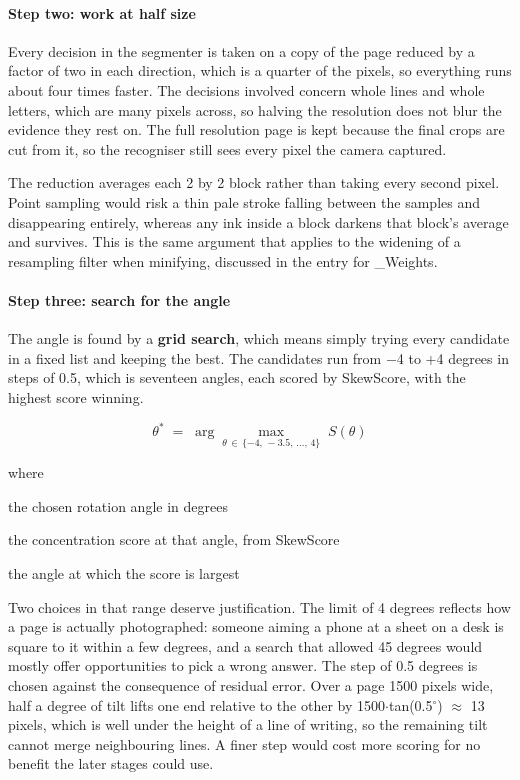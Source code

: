 \paragraph{Step two: work at half size}
Every decision in the segmenter is taken on a copy of the page reduced by a factor of two in each direction, which is a quarter of the pixels, so everything runs about four times faster. The decisions involved concern whole lines and whole letters, which are many pixels across, so halving the resolution does not blur the evidence they rest on. The full resolution page is kept because the final crops are cut from it, so the recogniser still sees every pixel the camera captured.

The reduction averages each 2 by 2 block rather than taking every second pixel. Point sampling would risk a thin pale stroke falling between the samples and disappearing entirely, whereas any ink inside a block darkens that block's average and survives. This is the same argument that applies to the widening of a resampling filter when minifying, discussed in the entry for \_Weights.


\paragraph{Step three: search for the angle}
The angle is found by a \textbf{grid search}, which means simply trying every candidate in a fixed list and keeping the best. The candidates run from $-$4 to +4 degrees in steps of 0.5, which is seventeen angles, each scored by SkewScore, with the highest score winning.


\begin{equation}
\theta^{*} \;=\; \arg\max_{\theta \,\in\, \{-4,\,-3.5,\,\dots,\,4\}} \; S(\theta)
\end{equation}

\noindent where
\begin{description}[leftmargin=2.4em,style=nextline,font=\normalfont\ttfamily]\setlength\itemsep{1pt}
  \item[{$\theta^{*}$}] \normalfont the chosen rotation angle in degrees
  \item[{$S(\theta)$}] \normalfont the concentration score at that angle, from SkewScore
  \item[{$\arg\max$}] \normalfont the angle at which the score is largest
\end{description}
Two choices in that range deserve justification. The limit of 4 degrees reflects how a page is actually photographed: someone aiming a phone at a sheet on a desk is square to it within a few degrees, and a search that allowed 45 degrees would mostly offer opportunities to pick a wrong answer. The step of 0.5 degrees is chosen against the consequence of residual error. Over a page 1500 pixels wide, half a degree of tilt lifts one end relative to the other by 1500$\cdot$tan(0.5$^\circ$) $\approx$ 13 pixels, which is well under the height of a line of writing, so the remaining tilt cannot merge neighbouring lines. A finer step would cost more scoring for no benefit the later stages could use.

